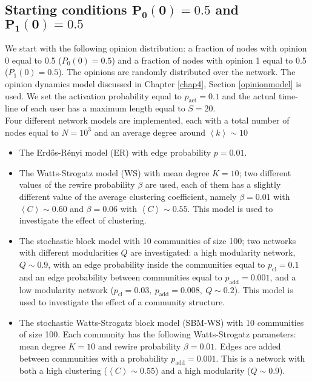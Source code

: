 \documentclass[11 pt , letterpaper , twoside , openright]{book}
\begin{document}
\subsection{Starting conditions $\bm{P_0(0) = 0.5}$ and $\bm{P_1(0)=0.5}$}
\label{50-50}
We start with the following opinion distribution: a fraction of nodes with opinion 0 equal to 0.5 ($P_0(0) = 0.5$) and a fraction of nodes with opinion 1 equal to 0.5 ($P_1(0) = 0.5$). The opinions are randomly distributed over the network. The opinion dynamics model discussed in Chapter \ref{chap4}, Section \ref{opinionmodel} %
is used. We set the activation probability equal to $p_{\text{act}} = 0.1$ and the actual time-line of each user has a maximum length equal to $S=20$.\\
\newline
Four different network models are implemented, each with a total number of nodes equal to $N = 10^3$ and an average degree around $\left<k\right> \sim 10$
\begin{itemize}
	\item The Erd\H{o}s-R\'{e}nyi model (ER) with edge probability $p = 0.01$.
	\item The Watts-Strogatz model (WS) with mean degree $K=10$; two different values of the rewire probability $\beta$ are used, each of them has a slightly different value of the average clustering coefficient, namely $\beta = 0.01$ with $\left<C\right> \sim 0.60$ and $\beta = 0.06$ with $\left<C\right> \sim 0.55$. This model is used to investigate the effect of clustering.
	\item The stochastic block model with 10 communities of size 100; two networks with different modularities $Q$ are investigated: a high modularity network, $Q \sim 0.9$, with an edge probability inside the communities equal to $p_{\text{cl}} = 0.1$ and an edge probability between communities equal to $p_{\text{add}} = 0.001$, and a low modularity network ($p_{\text{cl}} = 0.03,\ p_{\text{add}} = 0.008,\ Q \sim 0.2$). This model is used to investigate the effect of a community structure.
	\item The stochastic Watts-Strogatz block model (SBM-WS) with 10 communities of size 100. Each community has the following Watts-Strogatz parameters: mean degree $K =10$ and rewire probability $\beta = 0.01$. Edges are added between communities with a probability $p_{\text{add}} = 0.001$. This is a network with both a high clustering ($\left<C\right> \sim 0.55$) and a high modularity ($Q \sim 0.9$).
\end{itemize}
\end{document}
